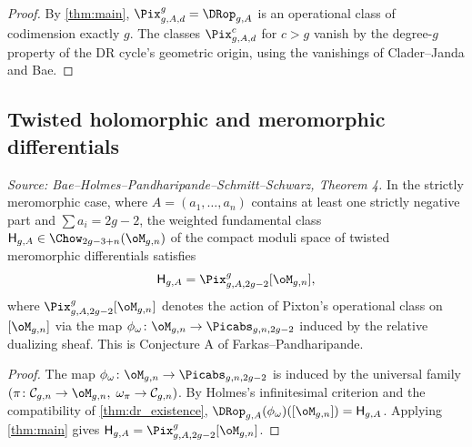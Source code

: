 \begin{proof}
  By \cref{thm:main}, $\Pix^g_{g,A,d} = \DRop_{g,A}$ is an operational class of
  codimension exactly $g$.  The classes $\Pix^c_{g,A,d}$ for $c > g$ vanish by the
  degree-$g$ property of the DR cycle's geometric origin, using the vanishings of
  Clader--Janda and Bae.
\end{proof}

\subsection{Twisted holomorphic and meromorphic differentials}

\begin{theorem}
  \label{thm:twisted_differentials}
  \textit{Source: Bae--Holmes--Pandharipande--Schmitt--Schwarz, Theorem 4.}
  In the strictly meromorphic case, where $A = (a_1,\ldots,a_n)$ contains at least one
  strictly negative part and $\sum a_i = 2g-2$, the weighted fundamental class
  $\mathsf{H}_{g,A} \in \Chow_{2g-3+n}(\oM_{g,n})$ of the compact moduli space of
  twisted meromorphic differentials satisfies
  \[
    \mathsf{H}_{g,A} = \Pix^g_{g,A,2g-2}[\oM_{g,n}],
  \]
  where $\Pix^g_{g,A,2g-2}[\oM_{g,n}]$ denotes the action of Pixton's operational
  class on $[\oM_{g,n}]$ via the map $\phi_\omega\colon \oM_{g,n} \to \Picabs_{g,n,2g-2}$
  induced by the relative dualizing sheaf.
  This is Conjecture A of Farkas--Pandharipande.
\end{theorem}

\begin{proof}
  The map $\phi_\omega\colon \oM_{g,n} \to \Picabs_{g,n,2g-2}$ is induced by the universal
  family $(\pi\colon \mathcal{C}_{g,n} \to \oM_{g,n},\; \omega_\pi \to \mathcal{C}_{g,n})$.
  By Holmes's infinitesimal criterion and the compatibility of \cref{thm:dr_existence},
  $\DRop_{g,A}(\phi_\omega)([\oM_{g,n}]) = \mathsf{H}_{g,A}$.
  Applying \cref{thm:main} gives $\mathsf{H}_{g,A} = \Pix^g_{g,A,2g-2}[\oM_{g,n}]$.
\end{proof}

